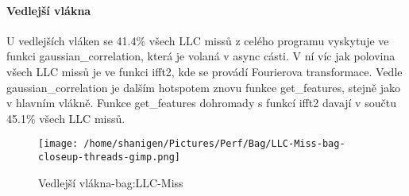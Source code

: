 \documentclass{article}
\begin{document}
\paragraph{Vedlejší vlákna}
U vedlejších vláken se 41.4\% všech LLC missů z celého programu vyskytuje ve funkci gaussian\_correlation, která je volaná v async cásti. V ní víc jak polovina všech LLC missů je ve funkci ifft2, kde se provádí Fourierova transformace. Vedle gaussian\_correlation je dalším hotspotem znovu funkce get\_features, stejně jako v hlavním vlákně. Funkce get\_features dohromady s funkcí ifft2 davají v součtu 45.1\% všech LLC missů.
\begin{figure}[h!]
	\centering
	\texttt{[image: /home/shanigen/Pictures/Perf/Bag/LLC-Miss-bag-closeup-threads-gimp.png]}
	\caption{Vedlejší vlákna-bag:LLC-Miss}
	\label{LLC-Miss-threads}
\end{figure}
\newpage
\end{document}
